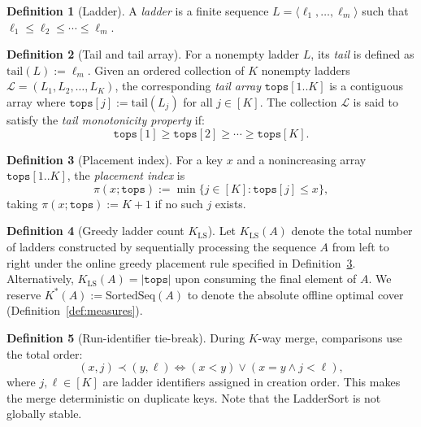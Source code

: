 \documentclass{ieeeaccess}
\theoremstyle{plain}
\theoremstyle{definition}
\newtheorem{definition}{Definition}[section]
\begin{document}
\begin{definition}[Ladder]
\label{def:ladder}
A \emph{ladder} is a finite sequence $L = \langle \ell_1, \ldots, \ell_m \rangle$ such that $\ell_1 \leq \ell_2 \leq \cdots \leq \ell_m$.
\end{definition}


\begin{definition}[Tail and tail array]
\label{def:tail}
For a nonempty ladder $L$, its \emph{tail} is defined as $\mathrm{tail}(L) := \ell_m$. 
Given an ordered collection of $K$ nonempty ladders $\mathcal{L} = (L_1, L_2, \ldots, L_K)$, 
the corresponding \emph{tail array} $\mathtt{tops}[1..K]$ is a contiguous array where 
$\mathtt{tops}[j] := \mathrm{tail}(L_j)$ for all $j \in [K]$. The collection $\mathcal{L}$ is 
said to satisfy the \emph{tail monotonicity property} if:
\[
  \mathtt{tops}[1] \geq \mathtt{tops}[2] \geq \cdots \geq \mathtt{tops}[K].
\]
\end{definition}


\begin{definition}[Placement index]
\label{def:placement}
For a key $x$ and a nonincreasing array $\mathtt{tops}[1..K]$, the \emph{placement index} is
\[
  \pi(x;\mathtt{tops}) := \min\bigl\{j \in [K] : \mathtt{tops}[j] \leq x\bigr\},
\]
taking $\pi(x;\mathtt{tops}) := K+1$ if no such $j$ exists.
\end{definition}
 

\begin{definition}[Greedy ladder count $K_{\mathrm{LS}}$]
\label{def:K}
Let $K_{\mathrm{LS}}(A)$ denote the total number of ladders constructed by sequentially processing 
the sequence $A$ from left to right under the online greedy placement rule specified in 
Definition~\ref{def:placement}. Alternatively, $K_{\mathrm{LS}}(A) = |\mathtt{tops}|$ upon 
consuming the final element of $A$. We reserve $K^*(A) := \mathrm{SortedSeq}(A)$ to denote the 
absolute offline optimal cover (Definition~\ref{def:measures}).
\end{definition}

\begin{definition}[Run-identifier tie-break]
\label{def:tiebreak}
During $K$-way merge, comparisons use the total order:
\[
  (x,j) \prec (y,\ell) \iff (x < y) \vee (x = y \wedge j < \ell),
\]
where $j, \ell \in [K]$ are ladder identifiers assigned in creation order. This makes the merge deterministic on duplicate keys. Note that the LadderSort is not globally stable.
\end{definition}
\end{document}

